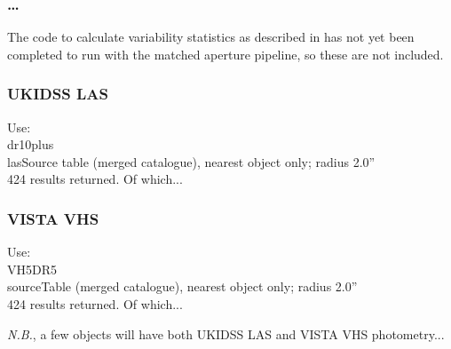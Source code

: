 \documentclass[usenatbib]{mnras}
\begin{document}
\subsubsection{\ldots}

The code to calculate variability statistics as described in \cite{Cross2009} has
not yet been completed to run with the matched aperture pipeline, so these are
not included.



\subsubsection{UKIDSS LAS} 
Use:\\
dr10plus\\
lasSource table (merged catalogue), nearest object only; radius 2.0'' \\
424 results returned. Of which...


\subsubsection{VISTA VHS} 
Use:\\
VH5DR5 \\
sourceTable (merged catalogue), nearest object only; radius 2.0'' \\
424 results returned.  Of which...

{\it N.B.}, a few objects will have both UKIDSS LAS and VISTA VHS photometry...


\iffalse
\subsection{Filter and Survey choices} 
We make some choices when reporting our archival photometry. 
This includes:
\begin{itemize}
\item Report Pan-STARRS1 DR1 $grizy$ wherever we have it; 
\item Report WFCAM $YJHK$ (mainly from the UKIDSS); 
\item Report VIRCAM $YJHK_{\rm S}$ (mainly from the VISTA surveys); 
\item Report VIRCAM $YJH$ over WFCAM  $YJH$; 
\item Report both VIRCAM $K_{\rm S}$ and WFCAM  $K$; 
\item Report DECam $grz$ wherever we have it (mainly from the DES and DECaLS); 
\item Due to lack of coverage, do not report WFCAM $Z$-band. 
\end{itemize}
\fi
\end{document}
